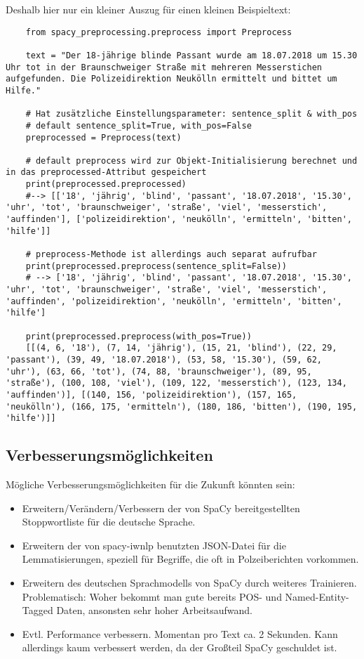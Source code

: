 Deshalb hier nur ein kleiner Auszug für einen kleinen Beispieltext:
\begin{verbatim}
    from spacy_preprocessing.preprocess import Preprocess
    
    text = "Der 18-jährige blinde Passant wurde am 18.07.2018 um 15.30 Uhr tot in der Braunschweiger Straße mit mehreren Messerstichen aufgefunden. Die Polizeidirektion Neukölln ermittelt und bittet um Hilfe."
    
    # Hat zusätzliche Einstellungsparameter: sentence_split & with_pos
    # default sentence_split=True, with_pos=False
    preprocessed = Preprocess(text)
    
    # default preprocess wird zur Objekt-Initialisierung berechnet und in das preprocessed-Attribut gespeichert
    print(preprocessed.preprocessed)
    #--> [['18', 'jährig', 'blind', 'passant', '18.07.2018', '15.30', 'uhr', 'tot', 'braunschweiger', 'straße', 'viel', 'messerstich', 'auffinden'], ['polizeidirektion', 'neukölln', 'ermitteln', 'bitten', 'hilfe']]
    
    # preprocess-Methode ist allerdings auch separat aufrufbar
    print(preprocessed.preprocess(sentence_split=False))
    # --> ['18', 'jährig', 'blind', 'passant', '18.07.2018', '15.30', 'uhr', 'tot', 'braunschweiger', 'straße', 'viel', 'messerstich', 'auffinden', 'polizeidirektion', 'neukölln', 'ermitteln', 'bitten', 'hilfe']
    
    print(preprocessed.preprocess(with_pos=True))
    [[(4, 6, '18'), (7, 14, 'jährig'), (15, 21, 'blind'), (22, 29, 'passant'), (39, 49, '18.07.2018'), (53, 58, '15.30'), (59, 62, 'uhr'), (63, 66, 'tot'), (74, 88, 'braunschweiger'), (89, 95, 'straße'), (100, 108, 'viel'), (109, 122, 'messerstich'), (123, 134, 'auffinden')], [(140, 156, 'polizeidirektion'), (157, 165, 'neukölln'), (166, 175, 'ermitteln'), (180, 186, 'bitten'), (190, 195, 'hilfe')]]
    \end{verbatim}

\subsection{Verbesserungsmöglichkeiten}
Mögliche Verbesserungsmöglichkeiten für die Zukunft könnten sein:
\begin{itemize}
\item Erweitern/Verändern/Verbessern der von SpaCy bereitgestellten Stoppwortliste für die deutsche Sprache.
\item Erweitern der von spacy-iwnlp benutzten JSON-Datei für die Lemmatisierungen, speziell für Begriffe, die oft in Polzeiberichten vorkommen.
\item Erweitern des deutschen Sprachmodells von SpaCy durch weiteres Trainieren. Problematisch: Woher bekommt man gute bereits POS- und Named-Entity-Tagged Daten, ansonsten sehr hoher Arbeitsaufwand.
\item Evtl. Performance verbessern. Momentan pro Text ca. 2 Sekunden. Kann allerdings kaum verbessert werden, da der Großteil SpaCy geschuldet ist.
\end{itemize}




